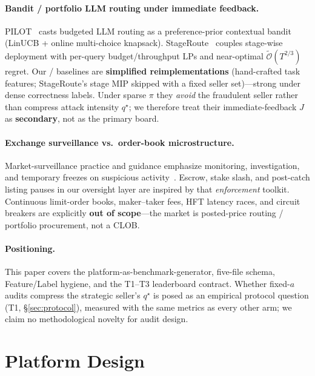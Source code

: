 \documentclass[sigconf,review]{acmart}
\newcommand{\qstar}{q^\star}
\begin{document}
\paragraph{Bandit / portfolio LLM routing under immediate feedback.} PILOT~\cite{panda2025pilot} casts budgeted LLM routing as a preference-prior contextual bandit (LinUCB + online multi-choice knapsack). StageRoute~\cite{li2026stageroute} couples stage-wise deployment with per-query budget/throughput LPs and near-optimal $\tilde{\mathcal{O}}(T^{2/3})$ regret. Our  /  baselines are \textbf{simplified reimplementations} (hand-crafted task features; StageRoute's stage MIP skipped with a fixed seller set)---strong under dense correctness labels. Under sparse $\pi$ they \emph{avoid} the fraudulent seller rather than compress attack intensity $\qstar$; we therefore treat their immediate-feedback $J$ as \textbf{secondary}, not as the primary board.

\paragraph{Exchange surveillance vs.\ order-book microstructure.} Market-surveillance practice and guidance emphasize monitoring, investigation, and temporary freezes on suspicious activity~\cite{iosco2009surveillance,cumming2008surveillance}. Escrow, stake slash, and post-catch listing pauses in our oversight layer are inspired by that \emph{enforcement} toolkit. Continuous limit-order books, maker--taker fees, HFT latency races, and circuit breakers are explicitly \textbf{out of scope}---the market is posted-price routing / portfolio procurement, not a CLOB.

\paragraph{Positioning.} This paper covers the platform-as-benchmark-generator, five-file schema, Feature/Label hygiene, and the T1--T3 leaderboard contract. Whether fixed-$a$ audits compress the strategic seller's $\qstar$ is posed as an empirical protocol question (T1, \S\ref{sec:protocol}), measured with the same metrics as every other arm; we claim no methodological novelty for audit design.

\section{Platform Design}
\label{sec:platform}
\end{document}
